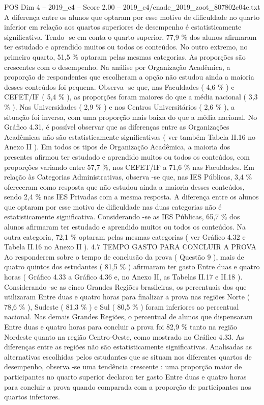 \begin{textsample}{POS Dim 4 – 2019\_c4 – Score 2.00 – 2019\_c4/enade\_2019\_zoot\_807802c04e.txt}
A diferença entre os alunos que optaram por esse motivo de dificuldade no quarto inferior em relação aos quartos superiores de desempenho é estatisticamente significativa.
Tendo -se em conta o quarto superior, 77,9 \% dos alunos afirmaram ter estudado e aprendido muitos ou todos os conteúdos.
No outro extremo, no primeiro quarto, 51,5 \% optaram pelas mesmas categorias.
As proporções são crescentes com o desempenho.
Na análise por Organização Acadêmica, a proporção de respondentes que escolheram a opção não estudou ainda a maioria desses conteúdos foi pequena.
Observa -se que, nas Faculdades ( 4,6 \% ) e CEFET/IF ( 5,4 \% ), as proporções foram maiores do que a média nacional ( 3,3 \% ).
Nas Universidades ( 2,9 \% ) e nos Centros Universitários ( 2,6 \% ), a situação foi inversa, com uma proporção mais baixa do que a média nacional.
No Gráfico 4.31, é possível observar que as diferenças entre as Organizações Acadêmicas não são estatisticamente significativas ( ver também Tabela II.16 no Anexo II ).
Em todos os tipos de Organização Acadêmica, a maioria dos presentes afirmou ter estudado e aprendido muitos ou todos os conteúdos, com proporções variando entre 57,7 \%, nos CEFET/IF a 71,6 \% nas Faculdades.
Em relação às Categorias Administrativas, observa -se que, nas IES Públicas, 3,4 \% ofereceram como resposta que não estudou ainda a maioria desses conteúdos, sendo 2,4 \% nas IES Privadas com a mesma resposta.
A diferença entre os alunos que optaram por esse motivo de dificuldade nas duas categorias não é estatisticamente significativa.
Considerando -se as IES Públicas, 65,7 \% dos alunos afirmaram ter estudado e aprendido muitos ou todos os conteúdos.
Na outra categoria, 72,1 \% optaram pelas mesmas categorias ( ver Gráfico 4.32 e Tabela II.16 no Anexo II ). 4.7 TEMPO GASTO PARA CONCLUIR A PROVA Ao responderem sobre o tempo de conclusão da prova ( Questão 9 ), mais de quatro quintos dos estudantes ( 81,5 \% ) afirmaram ter gasto Entre duas e quatro horas ( Gráfico 4.33 a Gráfico 4.36 e, no Anexo II, as Tabelas II.17 e II.18 ).
Considerando -se as cinco Grandes Regiões brasileiras, os percentuais dos que utilizaram Entre duas e quatro horas para finalizar a prova nas regiões Norte ( 78,6 \% ), Sudeste ( 81,3 \% ) e Sul ( 80,5 \% ) foram inferiores ao percentual nacional.
Nas demais Grandes Regiões, o percentual de alunos que dispensaram Entre duas e quatro horas para concluir a prova foi 82,9 \% tanto na região Nordeste quanto na região Centro-Oeste, como mostrado no Gráfico 4.33.
As diferenças entre as regiões não são estatisticamente significativas.
Analisadas as alternativas escolhidas pelos estudantes que se situam nos diferentes quartos de desempenho, observa -se uma tendência crescente : uma proporção maior de participantes no quarto superior declarou ter gasto Entre duas e quatro horas para concluir a prova quando comparada com a proporção de participantes nos quartos inferiores.

\end{textsample}
